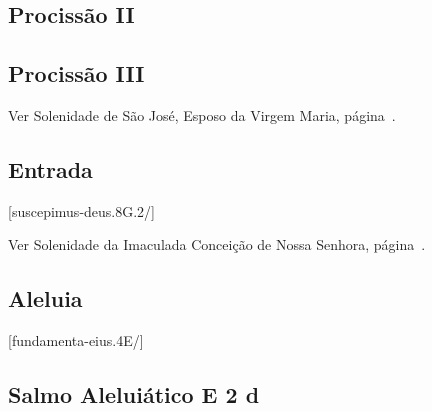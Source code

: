 \AllowPageFlush

\subsection{Procissão II}\label{subsection:proprium-sanctorum/in-praesentatione-domini/ad-processionem-2}

\subsection{Procissão III}
\begin{rubrica}
  Ver Solenidade de São José, Esposo da Virgem Maria, página~\pageref{subsection:proprium-sanctorum/sancti-ioseph-sponsi-bmv/psalmus-responsorius}.
\end{rubrica}

\AllowPageFlush

\subsection{Entrada}\label{subsection:proprium-sanctorum/in-praesentatione-domini/introitus}
[suscepimus-deus.8G.2/]


\begin{rubrica}
  Ver Solenidade da Imaculada Conceição de Nossa Senhora, página~\pageref{subsection:proprium-sanctorum/in-conceptione-immaculata-bmv/psalmus-responsorius}.
\end{rubrica}

\subsection{Aleluia}\label{subsection:proprium-sanctorum/in-praesentatione-domini/alleluia}
[fundamenta-eius.4E/]

\AllowPageFlush

\subsection[Salmo Aleluiático]{Salmo Aleluiático \textmd{E 2 d}}\label{subsection:proprium-sanctorum/in-praesentatione-domini/psalmus-alleluiaticus}

